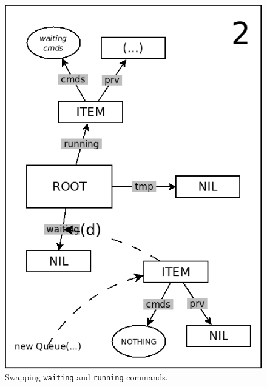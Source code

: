 \documentclass{acm_proc_article-sp}
\newcommand{\code}[1] {{\small{\texttt{#1}}}}
\begin{document}
\begin{figure}
\begin{minipage}[t]{0.24\linewidth}
\includegraphics[scale=0.25]{queue-12.png}
\end{minipage}
\caption{
Swapping \code{waiting} and \code{running} commands.
\label{fig.queue-1}
}
\end{figure}
\end{document}
